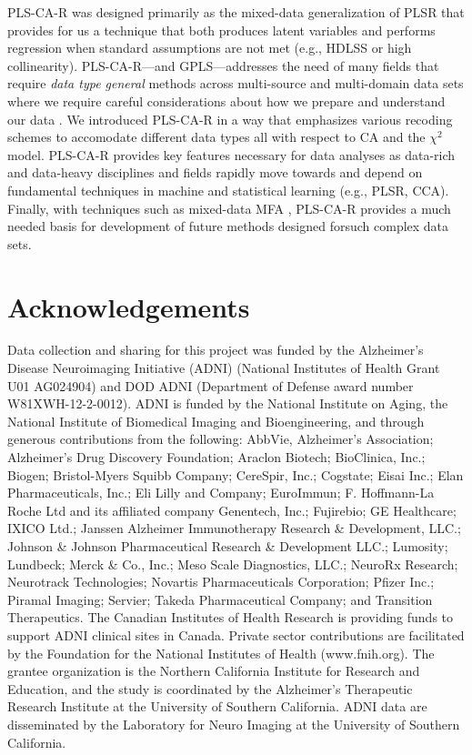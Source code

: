 \documentclass[12pt]{article}
\begin{document}
PLS-CA-R was designed primarily as the mixed-data generalization of PLSR
that provides for us a technique that both produces latent variables and
performs regression when standard assumptions are not met (e.g., HDLSS
or high collinearity). PLS-CA-R---and GPLS---addresses the need of many
fields that require \textit{data type general} methods across
multi-source and multi-domain data sets where we require careful
considerations about how we prepare and understand our data
\citep{nguyen2019ten}. We introduced PLS-CA-R in a way that emphasizes
various recoding schemes to accomodate different data types all with
respect to CA and the \(\chi^2\) model. PLS-CA-R provides key features
necessary for data analyses as data-rich and data-heavy disciplines and
fields rapidly move towards and depend on fundamental techniques in
machine and statistical learning (e.g., PLSR, CCA). Finally, with
techniques such as mixed-data MFA \citep{becue-bertaut_multiple_2008},
PLS-CA-R provides a much needed basis for development of future methods
designed forsuch complex data sets.

\hypertarget{acknowledgements}{%
\section{Acknowledgements}\label{acknowledgements}}

Data collection and sharing for this project was funded by the
Alzheimer's Disease Neuroimaging Initiative (ADNI) (National Institutes
of Health Grant U01 AG024904) and DOD ADNI (Department of Defense award
number W81XWH-12-2-0012). ADNI is funded by the National Institute on
Aging, the National Institute of Biomedical Imaging and Bioengineering,
and through generous contributions from the following: AbbVie,
Alzheimer's Association; Alzheimer's Drug Discovery Foundation; Araclon
Biotech; BioClinica, Inc.; Biogen; Bristol-Myers Squibb Company;
CereSpir, Inc.; Cogstate; Eisai Inc.; Elan Pharmaceuticals, Inc.; Eli
Lilly and Company; EuroImmun; F. Hoffmann-La Roche Ltd and its
affiliated company Genentech, Inc.; Fujirebio; GE Healthcare; IXICO
Ltd.; Janssen Alzheimer Immunotherapy Research \& Development, LLC.;
Johnson \& Johnson Pharmaceutical Research \& Development LLC.;
Lumosity; Lundbeck; Merck \& Co., Inc.; Meso Scale Diagnostics, LLC.;
NeuroRx Research; Neurotrack Technologies; Novartis Pharmaceuticals
Corporation; Pfizer Inc.; Piramal Imaging; Servier; Takeda
Pharmaceutical Company; and Transition Therapeutics. The Canadian
Institutes of Health Research is providing funds to support ADNI
clinical sites in Canada. Private sector contributions are facilitated
by the Foundation for the National Institutes of Health (www.fnih.org).
The grantee organization is the Northern California Institute for
Research and Education, and the study is coordinated by the Alzheimer's
Therapeutic Research Institute at the University of Southern California.
ADNI data are disseminated by the Laboratory for Neuro Imaging at the
University of Southern California.



\end{document}
